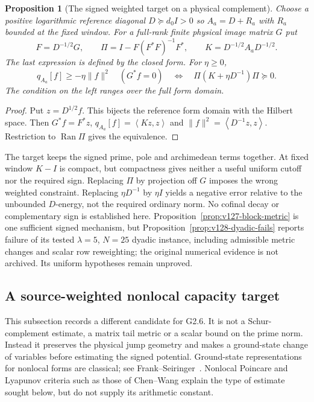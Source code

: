 \documentclass[11pt]{article}
\newtheorem{proposition}[theorem]{Proposition}
\theoremstyle{remark}
\newcommand{\ip}[2]{\left\langle #1,#2\right\rangle}
\begin{document}
\begin{proposition}[The signed weighted target on a physical complement]
\label{prop:v127-weighted-complement}
Choose a positive logarithmic reference diagonal $D\succeq d_0I>0$
so $A_a=D+R_a$ with $R_a$ bounded at the fixed window. For a full-rank
finite physical image matrix $G$ put
\[
 F=D^{-1/2}G,\qquad
 \Pi=I-F(F^*F)^{-1}F^*,\qquad
 K=D^{-1/2}A_aD^{-1/2}.
\]
The last expression is defined by the closed form. For $\eta\ge0$,
\begin{equation}\label{eq:v127-weighted-complement}
 q_{A_a}[f]\ge-\eta\|f\|^2\quad(G^*f=0)
 \quad\Longleftrightarrow\quad
 \Pi(K+\eta D^{-1})\Pi\succeq0.
\end{equation}
The condition on the left ranges over the full form domain.
\end{proposition}
\begin{proof}
Put $z=D^{1/2}f$. This bijects the reference form domain with the
Hilbert space. Then $G^*f=F^*z$,
$q_{A_a}[f]=\ip{Kz}{z}$ and $\|f\|^2=\ip{D^{-1}z}{z}$.
Restriction to $\operatorname{Ran}\Pi$ gives the equivalence.
\end{proof}

The target keeps the signed prime, pole and archimedean terms together.
At fixed window $K-I$ is compact, but compactness gives neither a useful
uniform cutoff nor the required sign. Replacing $\Pi$ by projection off
$G$ imposes the wrong weighted constraint. Replacing $\eta D^{-1}$ by
$\eta I$ yields a negative error relative to the unbounded $D$-energy,
not the required ordinary norm. No cofinal decay or complementary sign
is established here. Proposition~\ref{prop:v127-block-metric} is one
sufficient signed mechanism, but Proposition~\ref{prop:v128-dyadic-fails}
reports failure of its tested $\lambda=5$, $N=25$ dyadic instance,
including admissible metric changes and scalar row reweighting; the
original numerical evidence is not archived. Its
uniform hypotheses remain unproved.

\subsection*{A source-weighted nonlocal capacity target}

This subsection records a different candidate for G2.6. It is not a
Schur-complement estimate, a matrix tail metric or a scalar bound on the
prime norm. Instead it preserves the physical jump geometry and makes
a ground-state change of variables before estimating the signed
potential. Ground-state representations for nonlocal forms are
classical; see Frank--Seiringer~\cite{FrankSeiringer2008}. Nonlocal
Poincare and Lyapunov criteria such as those of Chen--Wang
\cite{ChenWang2013} explain the type of estimate sought below, but do
not supply its arithmetic constant.
\end{document}
